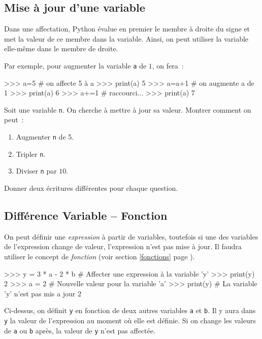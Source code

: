 {\subsection{Mise à jour d'une variable}
Dans une affectation, Python évalue en premier le membre à droite du signe \motcle{=} et met
la valeur de ce membre dans la variable. Ainsi, on peut utiliser la variable elle-même dans le
membre de droite.

Par exemple, pour augmenter la variable \texttt{a} de $1$, on fera~:

\begin{pythoncode}
>>> a=5                # on affecte 5 à a
>>> print(a)
5
>>> a=a+1              # on augmente a de 1
>>> print(a)
6
>>> a+=1               # raccourci...
>>> print(a)
7
\end{pythoncode}

\begin{exercice}
Soit une variable \texttt{n}. On cherche à mettre à jour sa valeur. Montrer comment on peut~:
\begin{enumerate}
	\item Augmenter \texttt{n} de 5.
	\item Tripler \texttt{n}.
	\item Diviser \texttt{n} par $10$.
\end{enumerate}
Donner deux écritures différentes pour chaque question.
\end{exercice}


\subsection{Différence Variable -- Fonction}
On peut définir une \textit{expression} à partir de variables, toutefois si une des variables de
l'expression  change de valeur, l'expression n'est pas mise à jour. Il faudra utiliser le concept
de \textit{fonction} (voir section \ref{fonctions} page \pageref{fonctions}).
\begin{pythoncode}
>>> y = 3 * a - 2 * b      # Affecter une expression à la variable 'y'
>>> print(y)
2
>>> a = 2                  # Nouvelle valeur pour la variable 'a'
>>> print(y)                # La variable 'y' n'est pas mis a jour
2
\end{pythoncode}
Ci-dessus, on définit \texttt{y} en fonction de deux autres variables
\texttt{a}  et \texttt{b}. Il y aura dans \texttt{y} la valeur de l'expression au moment où elle
est définie. Si on change les valeurs de \texttt{a} ou \texttt{b} après, la valeur de \texttt{y}
n'est pas affectée.

}
